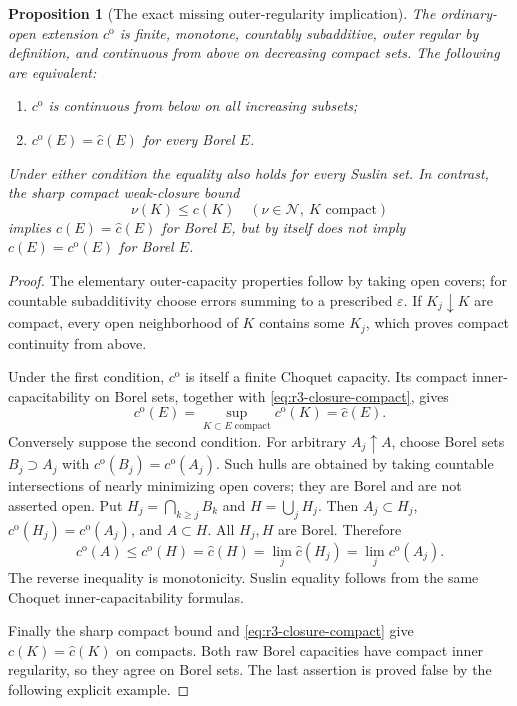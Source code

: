 \documentclass[11pt,a4paper]{article}
\numberwithin{equation}{section}
\newtheorem{proposition}[theorem]{Proposition}
\theoremstyle{definition}
\theoremstyle{remark}
\begin{document}
\begin{proposition}[The exact missing outer-regularity implication]
\label{prop:r3-outer-closure-equivalence}
The ordinary-open extension $c^{\mathrm o}$ is finite, monotone,
countably subadditive, outer regular by definition, and continuous
from above on decreasing compact sets.  The following are equivalent:
\begin{enumerate}
\item $c^{\mathrm o}$ is continuous from below on all increasing subsets;
\item $c^{\mathrm o}(E)=\widehat c(E)$ for every Borel $E$.
\end{enumerate}
Under either condition the equality also holds for every Suslin set.
In contrast, the sharp compact weak-closure bound
\[
 \nu(K)\leq c(K)\quad(\nu\in\mathcal N,\ K\text{ compact})
\]
implies $c(E)=\widehat c(E)$ for Borel $E$, but by itself does not
imply $c(E)=c^{\mathrm o}(E)$ for Borel $E$.
\end{proposition}

\begin{proof}
The elementary outer-capacity properties follow by taking open covers;
for countable subadditivity choose errors summing to a prescribed
$\varepsilon$.  If $K_j\downarrow K$ are compact, every open
neighborhood of $K$ contains some $K_j$, which proves compact
continuity from above.

Under the first condition, $c^{\mathrm o}$ is itself a finite Choquet
capacity.  Its compact inner-capacitability on Borel sets, together
with \eqref{eq:r3-closure-compact}, gives
\[
 c^{\mathrm o}(E)=\sup_{K\subset E\text{ compact}}c^{\mathrm o}(K)
                 =\widehat c(E).
\]
Conversely suppose the second condition.  For arbitrary
$A_j\uparrow A$, choose Borel sets $B_j\supset A_j$ with
$c^{\mathrm o}(B_j)=c^{\mathrm o}(A_j)$.  Such hulls are obtained
by taking countable intersections of nearly minimizing open covers;
they are Borel and are not asserted open.  Put
$H_j=\bigcap_{k\geq j}B_k$ and $H=\bigcup_jH_j$.
Then $A_j\subset H_j$, $c^{\mathrm o}(H_j)=c^{\mathrm o}(A_j)$,
and $A\subset H$.  All $H_j,H$ are Borel.  Therefore
\[
 c^{\mathrm o}(A)\leq c^{\mathrm o}(H)=\widehat c(H)
 =\lim_j\widehat c(H_j)=\lim_jc^{\mathrm o}(A_j).
\]
The reverse inequality is monotonicity.  Suslin equality follows
from the same Choquet inner-capacitability formulas.

Finally the sharp compact bound and
\eqref{eq:r3-closure-compact} give $c(K)=\widehat c(K)$ on compacts.
Both raw Borel capacities have compact inner regularity, so they
agree on Borel sets.  The last assertion is proved false by the
following explicit example.
\end{proof}
\end{document}
